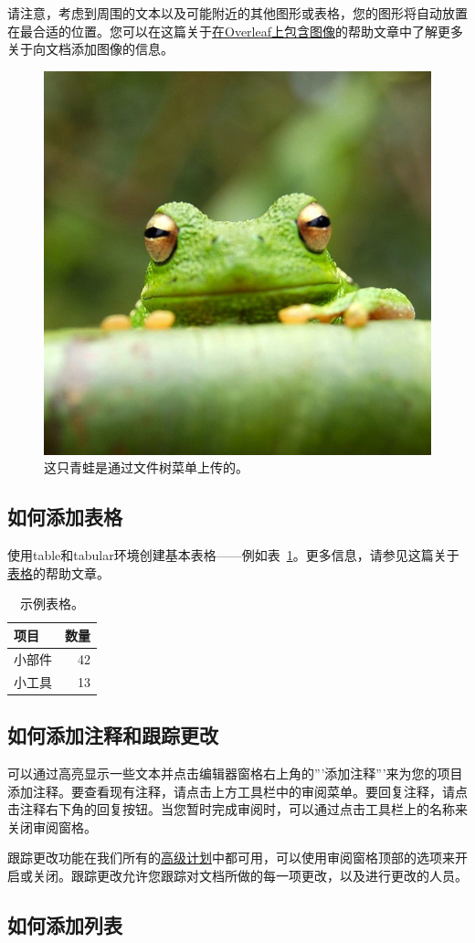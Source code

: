 \documentclass{article}
\begin{document}
请注意，考虑到周围的文本以及可能附近的其他图形或表格，您的图形将自动放置在最合适的位置。您可以在这篇关于\href{https://www.overleaf.com/learn/how-to/Including_images_on_Overleaf}{在Overleaf上包含图像}的帮助文章中了解更多关于向文档添加图像的信息。

\begin{figure}[H]
    \centering
    \includegraphics[width=0.25\linewidth]{frog.jpg}
    \caption{\label{fig:frog}这只青蛙是通过文件树菜单上传的。}
\end{figure}

\subsection{如何添加表格}

使用table和tabular环境创建基本表格——例如表~\ref{tab:widgets}。更多信息，请参见这篇关于\href{https://www.overleaf.com/learn/latex/tables}{表格}的帮助文章。

\begin{table}[H]
    \centering
    \begin{tabular}{l|r}
        项目  & 数量 \\\hline
        小部件 & 42 \\
        小工具 & 13
    \end{tabular}
    \caption{\label{tab:widgets}示例表格。}
\end{table}

\subsection{如何添加注释和跟踪更改}

可以通过高亮显示一些文本并点击编辑器窗格右上角的'''添加注释'''来为您的项目添加注释。要查看现有注释，请点击上方工具栏中的审阅菜单。要回复注释，请点击注释右下角的回复按钮。当您暂时完成审阅时，可以通过点击工具栏上的名称来关闭审阅窗格。

跟踪更改功能在我们所有的\href{https://www.overleaf.com/user/subscription/plans}{高级计划}中都可用，可以使用审阅窗格顶部的选项来开启或关闭。跟踪更改允许您跟踪对文档所做的每一项更改，以及进行更改的人员。

\subsection{如何添加列表}
\end{document}
